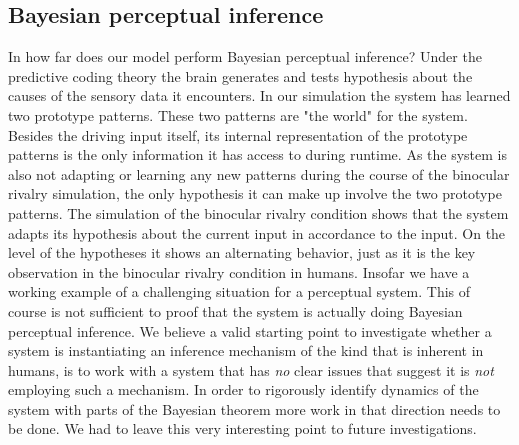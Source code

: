 \documentclass[utf8]{frontiersSCNS} %
\begin{document}
    
    \subsection{Bayesian perceptual inference}
    In how far does our model perform Bayesian perceptual inference? Under the predictive coding theory the brain generates and tests hypothesis about the causes of the sensory data it encounters. In our simulation the system has learned two prototype patterns. These two patterns are "the world" for the system. Besides the driving input itself, its internal representation of the prototype patterns is the only information it has access to during runtime. As the system is also not adapting or learning any new patterns during the course of the binocular rivalry simulation, the only hypothesis it can make up involve the two prototype patterns.
    The simulation of the binocular rivalry condition shows that the system adapts its hypothesis about the current input in accordance to the input. On the level of the hypotheses it shows an alternating behavior, just as it is the key observation in the binocular rivalry condition in humans. Insofar we have a working example of a challenging situation for a perceptual system. This of course is not sufficient to proof that the system is actually doing Bayesian perceptual inference. We believe a valid starting point to investigate whether a system is instantiating an inference mechanism of the kind that is inherent in humans, is to work with a system that has \textit{no} clear issues that suggest it is \textit{not} employing such a mechanism. In order to rigorously identify dynamics of the system with parts of the Bayesian theorem more work in that direction needs to be done. We had to leave this very interesting point to future investigations.  
    
\end{document}
